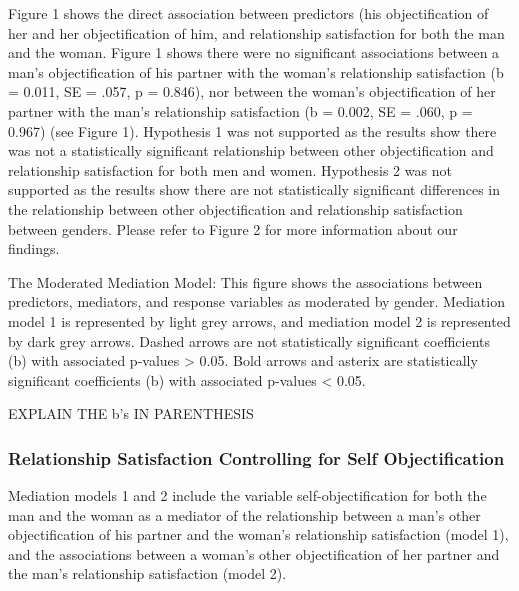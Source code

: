\documentclass[
  english,
  man]{apa6}
\begin{document}
Figure 1 shows the direct association between predictors (his objectification of her and her objectification of him, and relationship satisfaction for both the man and the woman. Figure 1 shows there were no significant associations between a man's objectification of his partner with the woman's relationship satisfaction (b = 0.011, SE = .057, p = 0.846), nor between the woman's objectification of her partner with the man's relationship satisfaction (b = 0.002, SE = .060, p = 0.967) (see Figure 1). Hypothesis 1 was not supported as the results show there was not a statistically significant relationship between other objectification and relationship satisfaction for both men and women. Hypothesis 2 was not supported as the results show there are not statistically significant differences in the relationship between other objectification and relationship satisfaction between genders. Please refer to Figure 2 for more information about our findings.

The Moderated Mediation Model: This figure shows the associations between predictors, mediators, and response variables as moderated by gender. Mediation model 1 is represented by light grey arrows, and mediation model 2 is represented by dark grey arrows. Dashed arrows are not statistically significant coefficients (b) with associated p-values \textgreater{} 0.05. Bold arrows and asterix are statistically significant coefficients (b) with associated p-values \textless{} 0.05.

EXPLAIN THE b's IN PARENTHESIS

\hypertarget{relationship-satisfaction-controlling-for-self-objectification}{%
\subsubsection{Relationship Satisfaction Controlling for Self Objectification}\label{relationship-satisfaction-controlling-for-self-objectification}}

Mediation models 1 and 2 include the variable self-objectification for both the man and the woman as a mediator of the relationship between a man's other objectification of his partner and the woman's relationship satisfaction (model 1), and the associations between a woman's other objectification of her partner and the man's relationship satisfaction (model 2).
\end{document}
